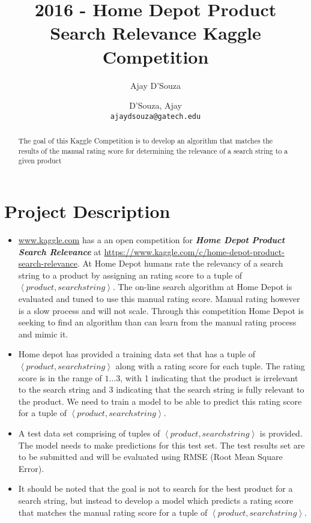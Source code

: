 \documentclass[twoside,12pt]{article}
\title{2016 - Home Depot Product Search Relevance Kaggle Competition}
\author{Ajay D'Souza }
\author{
  D'Souza, Ajay\\
  \texttt{ajaydsouza@gatech.edu}
}
\date{}
\newcommand{\tuple}[1]{\ensuremath{\left \langle #1 \right \rangle }}
\begin{document}
\maketitle

\begin{abstract}
The goal of this Kaggle Competition is to develop an algorithm that matches the results of the manual rating score for determining the relevance of a search string to a given product
\end{abstract}

\pagebreak
\tableofcontents


\pagebreak



%
%
\section{Project Description}
\label{Introduction}
\begin{itemize}
\item
\url{www.kaggle.com} has a an open competition for \textbf{\textit{Home Depot Product Search Relevance }} at \url{https://www.kaggle.com/c/home-depot-product-search-relevance}. At Home Depot humans rate the relevancy of a search string to a product by assigning an rating score to a tuple of \tuple{product,searchstring}. The on-line search algorithm at Home Depot is evaluated and tuned to use this manual rating score. Manual rating however is a slow process and will not scale. Through this competition Home Depot is seeking to find an algorithm than can learn from the manual rating process and mimic it.
\item
Home depot has provided a training data set that has a tuple of \tuple{product,searchstring} along with a rating score for each tuple. The rating score is in the range of $1\dots3$, with 1 indicating that the product is irrelevant to the search string and 3 indicating that the search string is fully relevant to the product. We need to train a model to be able to predict this  rating score for a tuple of \tuple{product,searchstring}. 
\item
A test data set comprising of tuples of \tuple{product,searchstring} is provided. The model needs to make predictions for this test set. The test results set are to be submitted and will be evaluated using RMSE (Root Mean Square Error). 
\item
It should be noted that the goal is not to search for the best product for a search string, but instead to develop a model which predicts a rating score that matches the manual rating score for a tuple of \tuple{product,searchstring}.
\end{itemize}
  
\end{document}
